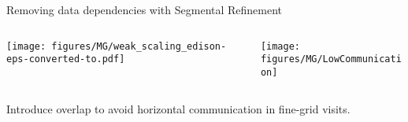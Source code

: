 \documentclass[final,t]{beamer}
\begin{document}
\begin{frame}{}
\begin{columns}
\begin{column}{0.31\textwidth}
\begin{block}{Removing data dependencies with Segmental Refinement}
\begin{columns}
\begin{column}{0.7\textwidth}
              \centering
              \texttt{[image: figures/MG/weak\_scaling\_edison-eps-converted-to.pdf]}
          \end{column}
          \begin{column}{0.3\textwidth}
              \centering
              \texttt{[image: figures/MG/LowCommunication]}
          \end{column}
        \end{columns}
        Introduce overlap to avoid horizontal communication in fine-grid visits.~\cite{adams2014segmental}
      \end{block}



\end{column}
\end{columns}
\end{frame}
\end{document}

